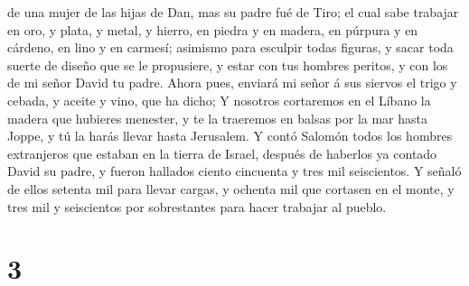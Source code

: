 de una mujer de las hijas de Dan, mas su padre fué de Tiro; el cual sabe
trabajar en oro, y plata, y metal, y hierro, en piedra y en madera, en
púrpura y en cárdeno, en lino y en carmesí; asimismo para esculpir todas
figuras, y sacar toda suerte de diseño que se le propusiere, y estar con
tus hombres peritos, y con los de mi señor David tu padre. 
Ahora pues, enviará mi señor á sus siervos el trigo y cebada, y aceite y
vino, que ha dicho;  Y nosotros cortaremos en el Líbano la
madera que hubieres menester, y te la traeremos en balsas por la mar
hasta Joppe, y tú la harás llevar hasta Jerusalem.  Y contó
Salomón todos los hombres extranjeros que estaban en la tierra de
Israel, después de haberlos ya contado David su padre, y fueron hallados
ciento cincuenta y tres mil seiscientos.  Y señaló de ellos
setenta mil para llevar cargas, y ochenta mil que cortasen en el monte,
y tres mil y seiscientos por sobrestantes para hacer trabajar al pueblo.

\hypertarget{section-2}{%
\section{3}\label{section-2}}


